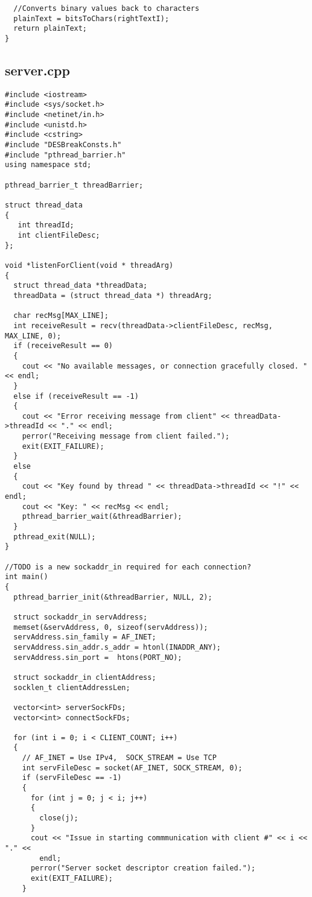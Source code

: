 \documentclass[11pt]{article}
\begin{document}
\begin{verbatim}
  //Converts binary values back to characters
  plainText = bitsToChars(rightTextI);
  return plainText;
}

\end{verbatim}

\subsection{server.cpp}
\begin{verbatim}
#include <iostream>
#include <sys/socket.h>
#include <netinet/in.h>
#include <unistd.h>
#include <cstring>
#include "DESBreakConsts.h"
#include "pthread_barrier.h"
using namespace std;

pthread_barrier_t threadBarrier;

struct thread_data
{
   int threadId;
   int clientFileDesc;
};

void *listenForClient(void * threadArg)
{
  struct thread_data *threadData;
  threadData = (struct thread_data *) threadArg;

  char recMsg[MAX_LINE];
  int receiveResult = recv(threadData->clientFileDesc, recMsg, MAX_LINE, 0);
  if (receiveResult == 0)
  {
    cout << "No available messages, or connection gracefully closed. " << endl;
  }
  else if (receiveResult == -1)
  {
    cout << "Error receiving message from client" << threadData->threadId << "." << endl;
    perror("Receiving message from client failed.");
    exit(EXIT_FAILURE);
  }
  else
  {
    cout << "Key found by thread " << threadData->threadId << "!" << endl;
    cout << "Key: " << recMsg << endl;
    pthread_barrier_wait(&threadBarrier);
  }
  pthread_exit(NULL);
}

//TODO is a new sockaddr_in required for each connection?
int main()
{
  pthread_barrier_init(&threadBarrier, NULL, 2);

  struct sockaddr_in servAddress;
  memset(&servAddress, 0, sizeof(servAddress));
  servAddress.sin_family = AF_INET;
  servAddress.sin_addr.s_addr = htonl(INADDR_ANY);
  servAddress.sin_port =  htons(PORT_NO);

  struct sockaddr_in clientAddress;
  socklen_t clientAddressLen;

  vector<int> serverSockFDs;
  vector<int> connectSockFDs;

  for (int i = 0; i < CLIENT_COUNT; i++)
  {
    // AF_INET = Use IPv4,  SOCK_STREAM = Use TCP
    int servFileDesc = socket(AF_INET, SOCK_STREAM, 0);
    if (servFileDesc == -1)
    {
      for (int j = 0; j < i; j++)
      {
        close(j);
      }
      cout << "Issue in starting commmunication with client #" << i << "." <<
        endl;
      perror("Server socket descriptor creation failed.");
      exit(EXIT_FAILURE);
    }


\end{verbatim}
\end{document}
